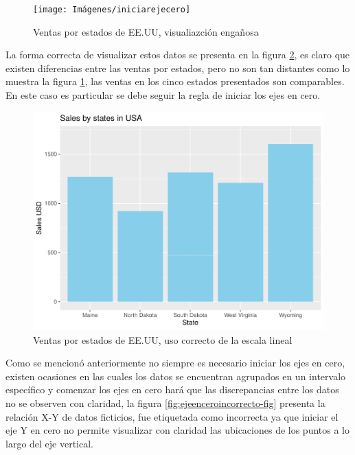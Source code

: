 \documentclass[
]{book}
\begin{document}
\begin{figure}

{\centering \texttt{[image: Imágenes/iniciarejecero]} 

}

\caption{Ventas por estados de EE.UU, visualiazción engañosa}\label{fig:usoincorrectoejey-fig}
\end{figure}

La forma correcta de visualizar estos datos se presenta en la figura \ref{fig:usocorrectoejeyinicio0-fig}, es claro que existen diferencias entre las ventas por estados, pero no son tan distantes como lo muestra la figura \ref{fig:usoincorrectoejey-fig}, las ventas en los cinco estados presentados son comparables. En este caso es particular se debe seguir la regla de iniciar los ejes en cero.

\begin{figure}

{\centering \includegraphics[width=0.8\linewidth]{Lineamientos-Visualizar_files/figure-latex/usocorrectoejeyinicio0-fig-1} 

}

\caption{Ventas por estados de EE.UU, uso correcto de la escala lineal}\label{fig:usocorrectoejeyinicio0-fig}
\end{figure}

Como se mencionó anteriormente no siempre es necesario iniciar los ejes en cero, existen ocasiones en las cuales los datos se encuentran agrupados en un intervalo específico y comenzar los ejes en cero hará que las discrepancias entre los datos no se observen con claridad, la figura \ref{fig:ejeenceroincorrecto-fig} presenta la relación X-Y de datos ficticios, fue etiquetada como incorrecta ya que iniciar el eje Y en cero no permite visualizar con claridad las ubicaciones de los puntos a lo largo del eje vertical.
\end{document}
